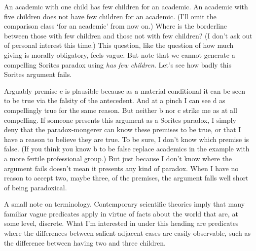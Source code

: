 An academic with one child has few children for an academic. An academic with five children does not have few children for an academic. (I'll omit the comparison class `for an academic' from now on.) Where is the borderline between those with few children and those not with few children? (I don't ask out of personal interest this time.) This question, like the question of how much giving is morally obligatory, feels vague. But note that we cannot generate a compelling Sorites paradox using \textit{has few children}. Let's see how badly this Sorites argument fails.


\noindent Arguably premise e is plausible because as a material conditional it can be seen to be true via the falsity of the antecedent. And at a pinch I can see d as compellingly true for the same reason. But neither b nor c strike me as at all compelling. If someone presents this argument as a Sorites paradox, I simply deny that the paradox-mongerer can know these premises to be true, or that I have a reason to believe they are true. To be sure, I don't know which premise is false. (If you think you know b to be false replace academics in the example with a more fertile professional group.) But just because I don't know where the argument fails doesn't mean it presents any kind of paradox. When I have no reason to accept two, maybe three, of the premises, the argument falls well short of being paradoxical.

A small note on terminology. Contemporary scientific theories imply that many familiar vague predicates apply in virtue of facts about the world that are, at some level, discrete. What I'm interested in under this heading are predicates where the differences between salient adjacent cases are easily observable, such as the difference between having two and three children.

